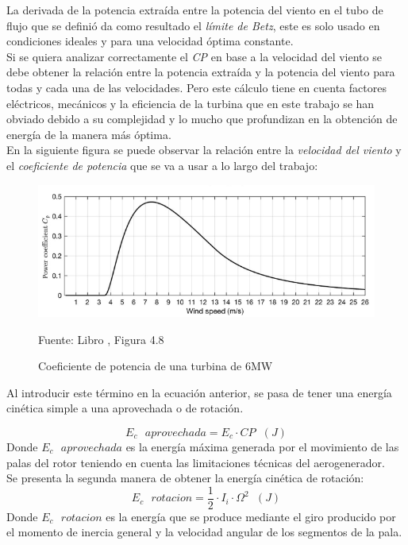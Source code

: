 La derivada de la potencia extraída entre la potencia del viento en el tubo de flujo que se definió da como resultado el \textit{límite de Betz}, este es solo usado en condiciones ideales y para una velocidad óptima constante. \\

Si se quiera analizar correctamente el \textit{CP} en base a la velocidad del viento se debe obtener la relación entre la potencia extraída y la potencia del viento para todas y cada una de las velocidades. Pero este cálculo tiene en cuenta factores eléctricos, mecánicos y la eficiencia de la turbina que en este trabajo se han obviado debido a su complejidad y lo mucho que profundizan en la obtención de energía de la manera más óptima. \\

En la siguiente figura se puede observar la relación entre la \textit{velocidad del viento} y el \textit{coeficiente de potencia} que se va a usar a lo largo del trabajo:

\begin{figure}[H]
    \centering
    \includegraphics[width=1\textwidth]{images/CP de una turbina de 6MW.PNG}
    \caption{Coeficiente de potencia de una turbina de 6MW}
    Fuente: Libro \cite{NEILL201883}, Figura 4.8
    \label{fig:coef_potencias_6MW}
\end{figure}


Al introducir este término en la ecuación anterior, se pasa de tener una energía cinética simple a una aprovechada o de rotación.

\begin{equation}
    E_c \text{ } aprovechada = E_c \cdot CP \hspace{7pt} (J)
\end{equation}
Donde $E_c \text{ } aprovechada$ es la energía máxima generada por el movimiento de las palas del rotor teniendo en cuenta las limitaciones técnicas del aerogenerador.\\

Se presenta la segunda manera de obtener la energía cinética de rotación:
\begin{equation}
    E_c  \text{ } rotacion = \dfrac{1}{2} \cdot I_i \cdot \Omega^2  \hspace{7pt} (J)
\end{equation}
Donde $E_c \text{ } rotacion$ es la energía que se produce mediante el giro producido por el momento de inercia general y la velocidad angular de los segmentos de la pala. \\

